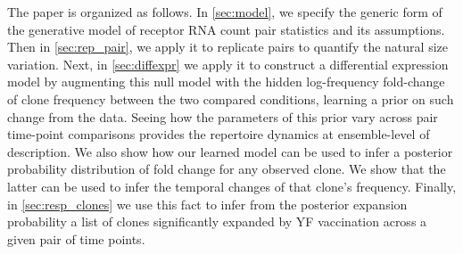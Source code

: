 \documentclass[letterpaper,english,prl,reprint,longbibliography]{revtex4-1} %
\begin{document}
\pacs{}

\maketitle



The paper is organized as follows. In \cref{sec:model}, we specify the generic form of the generative model of receptor RNA count pair statistics and its assumptions. Then in \cref{sec:rep_pair}, we apply it to replicate pairs to quantify the natural size variation. Next, in \cref{sec:diffexpr} we apply it to construct a differential expression model by augmenting this null model with the hidden log-frequency fold-change of clone frequency between the two compared conditions, learning a prior on such change from the data. Seeing how the parameters of this prior vary across pair time-point comparisons provides the repertoire dynamics at ensemble-level of description. We also show how our learned model can be used to infer a posterior probability distribution of fold change for any observed clone. We show that the latter can be used to infer the temporal changes of that clone's frequency. Finally, in \cref{sec:resp_clones} we use this fact to infer from the posterior expansion probability a list of clones significantly expanded by YF vaccination across a given pair of time points. 
\end{document}

